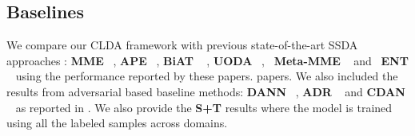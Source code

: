 \subsection{Baselines}
We compare our CLDA framework with previous state-of-the-art SSDA approaches : \textbf{MME} ~\cite{Saito2019SemiSupervisedDA}, \textbf{APE} ~\cite{Kim2020AttractPA}, \textbf{BiAT} ~\cite{Jiang2020BidirectionalAT} , \textbf{UODA} ~\cite{Qin2020Contradictory}, ~\textbf{Meta-MME} ~\cite{Li2020OnlineMF} and ~\textbf{ENT} ~\cite{Grandvalet2004SemisupervisedLB} using the performance reported by these papers. papers. We also included the results from adversarial based baseline methods:
\textbf{DANN} ~\cite{Ganin2016DomainAdversarialTO}, \textbf{ADR} ~\cite{Saito2018AdversarialDR} and \textbf{CDAN} ~\cite{Long2018ConditionalAD} as reported in \cite{Saito2019SemiSupervisedDA}. We also provide the \textbf{S+T} results where the model is trained using all the labeled samples across domains.
